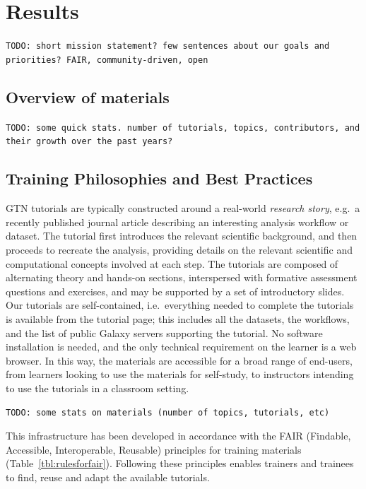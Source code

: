 \documentclass[10pt,letterpaper]{article}
\begin{document}
\section*{Results}

\verb+TODO: short mission statement? few sentences about our goals and priorities? FAIR, community-driven, open+


\subsection*{Overview of materials}

\verb+TODO: some quick stats. number of tutorials, topics, contributors, and their growth over the past years?+



\subsection*{Training Philosophies and Best Practices}

GTN tutorials are typically constructed around a real-world \emph{research story}, e.g.\ a recently published journal article describing an interesting analysis workflow or dataset.
The tutorial first introduces the relevant scientific background, and then proceeds to recreate the analysis, providing details on the relevant scientific and computational concepts involved at each step.
The tutorials are composed of alternating theory and hands-on sections, interspersed with formative assessment questions and exercises, and may be supported by a set of introductory slides.
Our tutorials are self-contained, i.e.\ everything needed to complete the tutorials is available from the tutorial page; this includes all the datasets, the workflows, and the list of public Galaxy servers supporting the tutorial. No software installation is needed, and the only technical requirement on the learner is a web browser.
In this way, the materials are accessible for a broad range of end-users, from learners looking to use the materials for self-study, to instructors intending to use the tutorials in a classroom setting.

\verb+TODO: some stats on materials (number of topics, tutorials, etc)+


This infrastructure has been developed in accordance with the FAIR (Findable, Accessible, Interoperable, Reusable) principles for training materials \cite{Garcia2020} (Table~\ref{tbl:rulesforfair}).
Following these principles enables trainers and trainees to find, reuse and adapt the available tutorials. %
\end{document}
